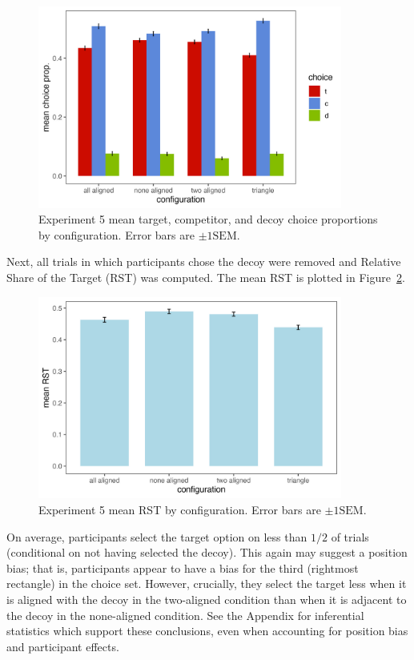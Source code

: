 \begin{figure}
   \includegraphics[width=100mm]{figures/comparability_crit_choice_by_config.jpeg}
   \caption{Experiment 5 mean target, competitor, and decoy choice proportions by configuration. Error bars are $\pm1\mathrm{SEM}$.}
   \label{fig:comparability_crit_mean_tcd_choices}
\end{figure}

Next, all trials in which participants chose the decoy were removed and Relative Share of the Target (RST) was computed. The mean RST is plotted in Figure~\ref{fig:comparability_crit_mean_target_choices}.

\begin{figure}
   \includegraphics[width=100mm]{figures/comparability_crit_rst_by_config.jpeg}
   \caption{Experiment 5 mean RST by configuration. Error bars are $\pm1\mathrm{SEM}$.}
   \label{fig:comparability_crit_mean_target_choices}
\end{figure}

On average, participants select the target option on less than $1/2$ of trials (conditional on not having selected the decoy). This again may suggest a position bias; that is, participants appear to have a bias for the third (rightmost rectangle) in the choice set. However, crucially, they select the target less when it is aligned with the decoy in the two-aligned condition than when it is adjacent to the decoy in the none-aligned condition. See the Appendix for inferential statistics which support these conclusions, even when accounting for position bias and participant effects.

